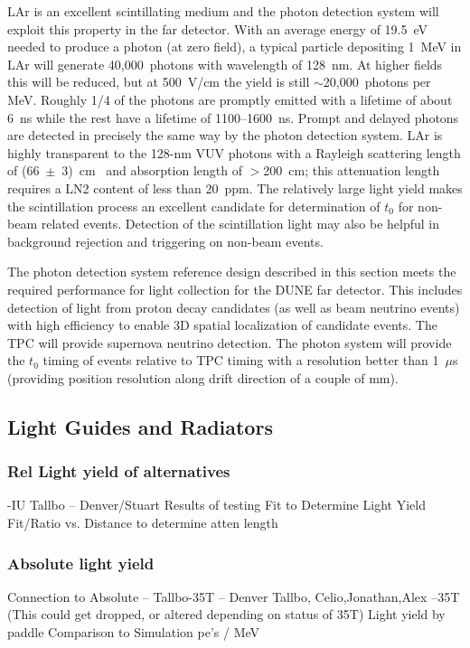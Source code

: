 LAr is an excellent scintillating medium and the photon detection
system will exploit this property in the far detector.  With an
average energy of 19.5~eV needed to produce a photon (at zero field),
a typical particle depositing 1~MeV in LAr will generate
40,000~photons with wavelength of 128~nm. At higher fields this will
be reduced, but at 500~V/cm the yield is still $\sim$20,000~photons
per MeV. Roughly 1/4 of the photons are promptly emitted with a
lifetime of about 6~ns while the rest have a lifetime of
1100--1600~ns. Prompt and delayed photons are detected in
  precisely the same way by the photon detection system. LAr is
highly transparent to the 128-nm VUV photons with a Rayleigh
scattering length of (66~$\pm$~3)~cm~\cite{Rayleigh} and absorption
length of $>$200~cm; this attenuation length requires a LN2
  content of less than 20~ppm. The relatively large light yield makes
the scintillation process an excellent candidate for determination of
$t_0$ for non-beam related events. Detection of the scintillation
light may also be helpful in background rejection and triggering on
non-beam events.

The photon detection system reference design described in this section
meets the required performance for light collection for the DUNE far
detector. This includes detection of light from proton decay
candidates (as well as beam neutrino events) with high efficiency to
enable 3D spatial localization of candidate events. The TPC will
provide supernova neutrino detection. 
The photon system will provide the $t_0$ timing of
events relative to TPC timing with a resolution better than 1~$\mu$s
(providing position resolution along drift direction of a couple of mm). 


\subsection{Light Guides and Radiators}

\subsubsection{Rel Light yield of alternatives}
      -IU Tallbo -- Denver/Stuart
     Results of testing
     Fit to Determine Light Yield
     Fit/Ratio vs. Distance to determine atten length     

\subsubsection{ Absolute light yield}
     Connection to Absolute -- Tallbo-35T  -- Denver Tallbo, Celio,Jonathan,Alex --35T
     (This could get dropped, or altered depending on status of 35T)
     Light yield by paddle
     Comparison to Simulation
     pe's / MeV 

